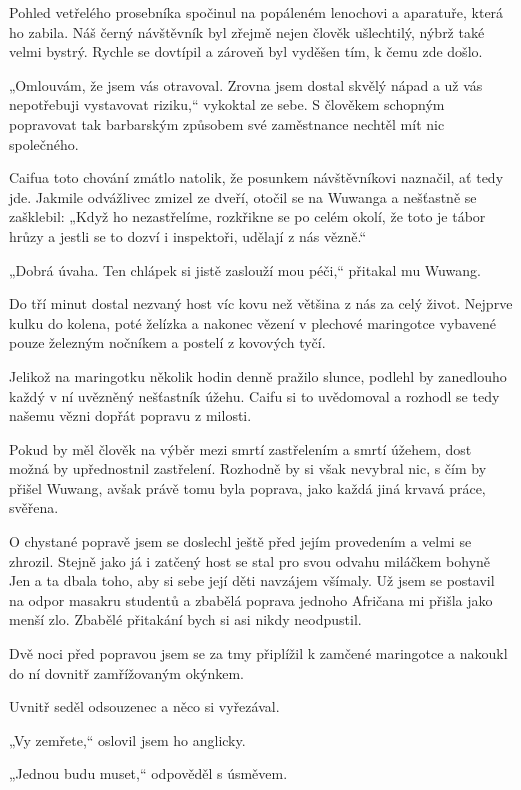 Pohled vetřelého prosebníka spočinul na popáleném lenochovi a aparatuře, která ho zabila. Náš černý návštěvník byl zřejmě nejen člověk ušlechtilý, nýbrž také velmi bystrý. Rychle se dovtípil a zároveň byl vyděšen tím, k čemu zde došlo.
	
 „Omlouvám, že jsem vás otravoval. Zrovna jsem dostal skvělý nápad a už vás nepotřebuji vystavovat riziku,“ vykoktal ze sebe. S člověkem schopným popravovat tak barbarským způsobem své zaměstnance nechtěl mít nic společného.
	
 Caifua toto chování zmátlo natolik, že posunkem návštěvníkovi naznačil, ať tedy jde. Jakmile odvážlivec zmizel ze dveří, otočil se na Wuwanga a nešťastně se zašklebil: „Když ho nezastřelíme, rozkřikne se po celém okolí, že toto je tábor hrůzy a jestli se to dozví i inspektoři, udělají z nás vězně.“
	
 „Dobrá úvaha. Ten chlápek si jistě zaslouží mou péči,“ přitakal mu Wuwang. 
	
 Do tří minut dostal nezvaný host víc kovu než většina z nás za celý život. Nejprve kulku do kolena, poté želízka a nakonec vězení v plechové maringotce vybavené pouze železným nočníkem a postelí z kovových tyčí. 

Jelikož na maringotku několik hodin denně pražilo slunce, podlehl by zanedlouho každý v ní uvězněný nešťastník úžehu. Caifu si to uvědomoval a rozhodl se tedy našemu vězni dopřát popravu z milosti.
	
 Pokud by měl člověk na výběr mezi smrtí zastřelením a smrtí úžehem, dost možná by upřednostnil zastřelení. Rozhodně by si však nevybral nic, s čím by přišel Wuwang, avšak právě tomu byla poprava, jako každá jiná krvavá práce, svěřena.

	
 O chystané popravě jsem se doslechl ještě před jejím provedením a velmi se zhrozil.  Stejně jako já i zatčený host se stal pro svou odvahu miláčkem bohyně Jen a ta dbala toho, aby si sebe její děti navzájem všímaly. Už jsem se postavil na odpor masakru studentů a zbabělá poprava jednoho Afričana mi přišla jako menší zlo. Zbabělé přitakání bych si asi nikdy neodpustil.
	
 Dvě noci před popravou jsem se za tmy připlížil k zamčené maringotce a nakoukl do ní dovnitř zamřížovaným okýnkem.
	
 Uvnitř seděl odsouzenec a něco si vyřezával. 
	
 „Vy zemřete,“ oslovil jsem ho anglicky.
	
 „Jednou budu muset,“ odpověděl s úsměvem.
	

